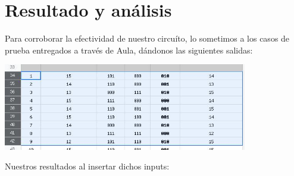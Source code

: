 \documentclass[a4paper]{article}
\begin{document}
\newpage

\section{Resultado y análisis}

Para corroborar la efectividad de nuestro circuíto, lo sometimos a los casos de prueba entregados a través de Aula, dándonos las siguientes salidas:

\begin{center}
	\includegraphics[width=0.8\textwidth]{tarea-2-casos.jpg}
\end{center}

Nuestros resultados al insertar dichos inputs:
\end{document}
